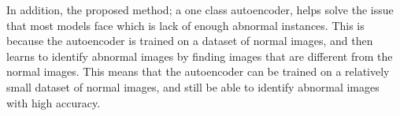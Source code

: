 \documentclass[journal,12pt,onecolumn,draftcls]{IEEEtran}
\begin{document}
In addition, the proposed method; a one class autoencoder, helps solve the issue that most models face which is lack of enough abnormal instances. This is because the autoencoder is trained on a dataset of normal images, and then learns to identify abnormal images by finding images that are different from the normal images. This means that the autoencoder can be trained on a relatively small dataset of normal images, and still be able to identify abnormal images with high accuracy.

\newpage


\end{document}
